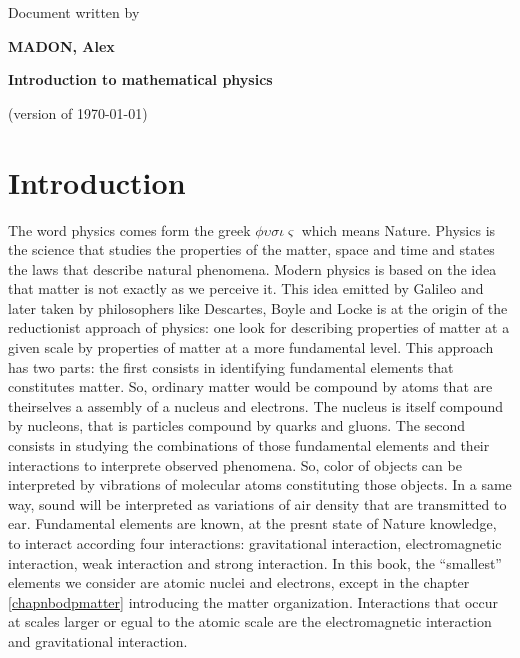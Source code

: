 \documentclass[12pt]{book}
\newif\ifpdf\ifx\pdfoutput\undefined\pdffalse\else\pdfoutput=1\pdftrue\fi
\begin{document}
\ifpdf{}\else\fi
\def\tiii{
\begin{titlepage}

\begin{center}
\null
\par
\vspace{20mm}

{Document written by}

\vspace{5mm}

{\large\bf MADON, Alex}

\vspace{15mm}

{\Large\bf Introduction to mathematical physics}

\vspace{10mm}





\vspace{65mm}

(version of \today)
\end{center}
\end{titlepage}
}%
\tiii
\tableofcontents


\chapter{Introduction}
The word physics comes form the greek $\phi\upsilon\sigma\iota\varsigma$
which means Nature. Physics is the science that studies the properties of the
matter, space and time and states the laws that describe natural phenomena.
Modern physics is based on the idea that matter is not exactly as we perceive
it. This idea emitted by Galileo and later taken by philosophers like
Descartes, 
Boyle and Locke is at the origin of the reductionist approach of physics: one
look for describing properties of matter at a given scale by
properties of matter at a more 
fundamental level. This approach has two parts: the first consists in
identifying 
fundamental elements that constitutes matter. So, ordinary matter
would be compound by atoms that are theirselves a assembly 
of a nucleus and electrons. The nucleus is itself compound by nucleons, that is
particles compound by quarks and gluons. 
The second consists in studying
the combinations of those fundamental elements and their interactions to
interprete observed phenomena. So, color of objects can be interpreted by
vibrations of molecular atoms constituting those objects.
In a same way, sound will be interpreted as variations of air density that are
transmitted to ear.
Fundamental elements are known, at the presnt state of Nature
knowledge, to interact according four interactions:
gravitational interaction, electromagnetic interaction, weak interaction and
strong interaction. In this book, the ``smallest'' elements we consider are
atomic nuclei and electrons, except in the chapter
\ref{chapnbodpmatter} introducing the matter
organization. Interactions that occur at scales larger or egual to the
atomic scale are the electromagnetic
interaction and gravitational interaction. 
\end{document}
